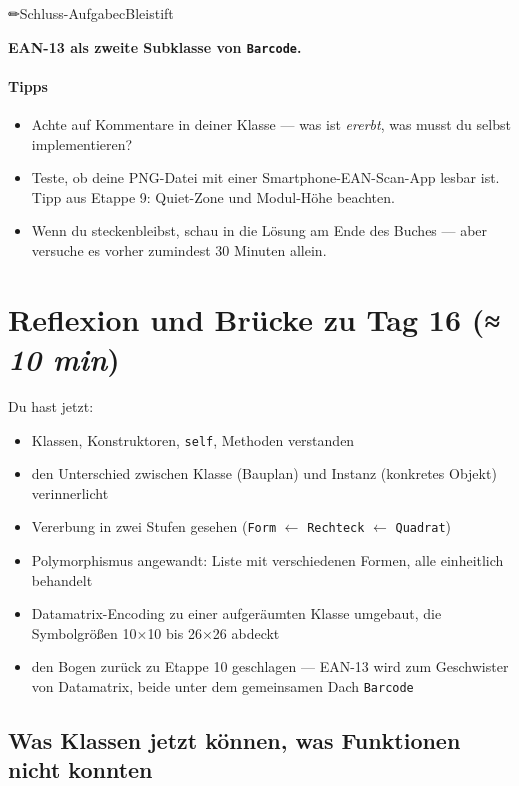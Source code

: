 \begin{aufgabe}{✏}{Schluss-}{Aufgabe}{cBleistift}{\bfseries
EAN-13 als zweite Subklasse von \texttt{Barcode}.\par}
\paragraph{Tipps}
\begin{itemize}
\item Achte auf Kommentare in deiner Klasse — was ist
  \emph{ererbt}, was musst du selbst implementieren?
\item Teste, ob deine PNG-Datei mit einer Smartphone-EAN-Scan-App
  lesbar ist. Tipp aus Etappe 9: Quiet-Zone und Modul-Höhe
  beachten.
\item Wenn du steckenbleibst, schau in die Lösung am Ende des
  Buches — aber versuche es vorher zumindest 30 Minuten allein.
\end{itemize}

\end{aufgabe}

\section{Reflexion und Brücke zu Tag 16 \normalfont(\textit{≈ 10 min})}

Du hast jetzt:

\begin{itemize}
\item Klassen, Konstruktoren, \texttt{self}, Methoden verstanden
\item den Unterschied zwischen Klasse (Bauplan) und Instanz
  (konkretes Objekt) verinnerlicht
\item Vererbung in zwei Stufen gesehen
  (\texttt{Form} $\leftarrow$ \texttt{Rechteck} $\leftarrow$
  \texttt{Quadrat})
\item Polymorphismus angewandt: Liste mit verschiedenen Formen,
  alle einheitlich behandelt
\item Datamatrix-Encoding zu einer aufgeräumten Klasse umgebaut,
  die Symbolgrößen 10$\times$10 bis 26$\times$26 abdeckt
\item den Bogen zurück zu Etappe 10 geschlagen — EAN-13 wird zum
  Geschwister von Datamatrix, beide unter dem gemeinsamen Dach
  \texttt{Barcode}
\end{itemize}

\subsection*{Was Klassen jetzt können, was Funktionen nicht
konnten}

